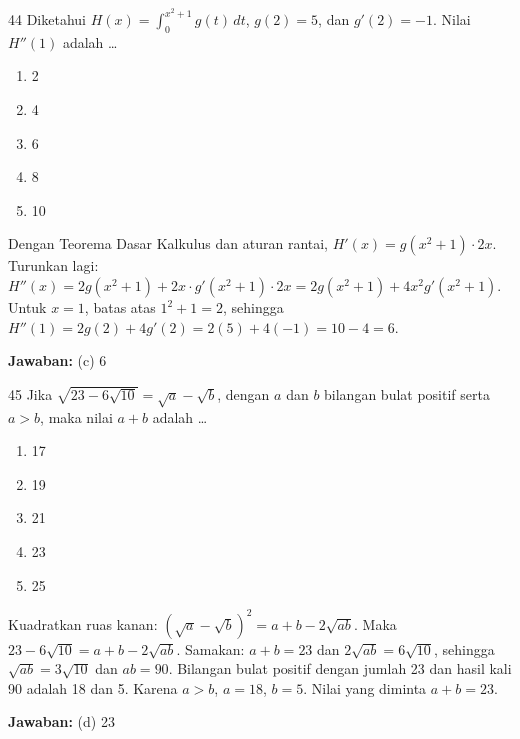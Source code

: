 \documentclass[11pt]{article}
\newenvironment{pil}{\begin{enumerate}[label=(\alph*),leftmargin=*,itemsep=1pt,topsep=3pt]}{\end{enumerate}}
\newcommand{\jw}[1]{\par\smallskip\noindent\textbf{Jawaban:} #1}
\begin{document}
\begin{soalbox}{44}
Diketahui $H(x)=\displaystyle\int_0^{x^2+1}g(t)\,dt$, $g(2)=5$, dan $g'(2)=-1$. Nilai $H''(1)$ adalah \ldots
\begin{pil}\item 2 \item 4 \item 6 \item 8 \item 10\end{pil}
\end{soalbox}
\begin{pembox}
Dengan Teorema Dasar Kalkulus dan aturan rantai, $H'(x)=g(x^2+1)\cdot2x$. Turunkan lagi: $H''(x)=2g(x^2+1)+2x\cdot g'(x^2+1)\cdot2x=2g(x^2+1)+4x^2 g'(x^2+1)$. Untuk $x=1$, batas atas $1^2+1=2$, sehingga $H''(1)=2g(2)+4g'(2)=2(5)+4(-1)=10-4=6$.
\jw{(c) 6}
\end{pembox}

\begin{soalbox}{45}
Jika $\sqrt{23-6\sqrt{10}}=\sqrt{a}-\sqrt{b}$, dengan $a$ dan $b$ bilangan bulat positif serta $a>b$, maka nilai $a+b$ adalah \ldots
\begin{pil}\item 17 \item 19 \item 21 \item 23 \item 25\end{pil}
\end{soalbox}
\begin{pembox}
Kuadratkan ruas kanan: $(\sqrt{a}-\sqrt{b})^2=a+b-2\sqrt{ab}$. Maka $23-6\sqrt{10}=a+b-2\sqrt{ab}$. Samakan: $a+b=23$ dan $2\sqrt{ab}=6\sqrt{10}$, sehingga $\sqrt{ab}=3\sqrt{10}$ dan $ab=90$. Bilangan bulat positif dengan jumlah 23 dan hasil kali 90 adalah 18 dan 5. Karena $a>b$, $a=18$, $b=5$. Nilai yang diminta $a+b=23$.
\jw{(d) 23}
\end{pembox}
\end{document}
